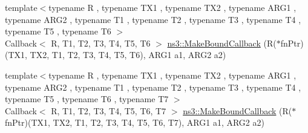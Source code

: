\begin{DoxyCompactItemize}
\item 
{\footnotesize template$<$typename R , typename T\+X1 , typename T\+X2 , typename A\+R\+G1 , typename A\+R\+G2 , typename T1 , typename T2 , typename T3 , typename T4 , typename T5 , typename T6 $>$ }\\Callback$<$ R, T1, T2, T3, T4, T5, T6 $>$ \hyperlink{group__makeboundcallback_gab8d20d11a9970154e01118d130b1a1fa}{ns3\+::\+Make\+Bound\+Callback} (R($\ast$fn\+Ptr)(T\+X1, T\+X2, T1, T2, T3, T4, T5, T6), A\+R\+G1 a1, A\+R\+G2 a2)
\item 
{\footnotesize template$<$typename R , typename T\+X1 , typename T\+X2 , typename A\+R\+G1 , typename A\+R\+G2 , typename T1 , typename T2 , typename T3 , typename T4 , typename T5 , typename T6 , typename T7 $>$ }\\Callback$<$ R, T1, T2, T3, T4, T5, T6, T7 $>$ \hyperlink{group__makeboundcallback_ga4db39425a2e4b3fd38cd31a7c79c1e08}{ns3\+::\+Make\+Bound\+Callback} (R($\ast$fn\+Ptr)(T\+X1, T\+X2, T1, T2, T3, T4, T5, T6, T7), A\+R\+G1 a1, A\+R\+G2 a2)
\end{DoxyCompactItemize}
